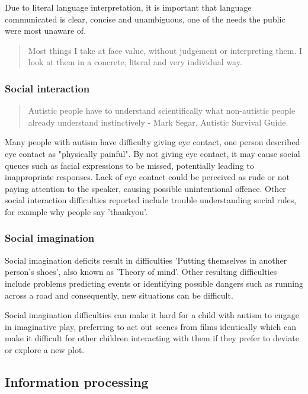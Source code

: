 \documentclass[11pt]{report}
\begin{document}
Due to literal language interpretation, it is important that language communicated is clear, concise and unambiguous, one of the needs the public were most unaware of\cite{autismmisconception}.

\begin{quote}
Most things I take at face value, without judgement or interpreting them. I look at them in a concrete, literal and very individual way. \cite{olgab}
\end{quote}

\subsubsection*{Social interaction}

\begin{quote}
Autistic people have to understand scientifically what non-autistic people already understand instinctively 
- Mark Segar, Autistic Survival Guide.
\end{quote}

Many people with autism have difficulty giving eye contact, one person described eye contact as "physically painful". By not giving eye contact, it may cause social queues such as facial expressions to be missed, potentially leading to inappropriate responses. Lack of eye contact could be perceived as rude or not paying attention to the speaker, causing possible unintentional offence. Other social interaction difficulties reported include trouble understanding social rules\cite{nas}, for example why people say 'thankyou'.

\subsubsection*{Social imagination}
Social imagination deficits result in difficulties 'Putting themselves in another person's shoes', also known as 'Theory of mind'. Other resulting difficulties include problems predicting events or identifying possible dangers such as running across a road and consequently, new situations can be difficult.\cite{nas}

Social imagination difficulties can make it hard for a child with autism to engage in imaginative play, preferring to act out scenes from films identically which can make it difficult for other children interacting with them if they prefer to deviate or explore a new plot.\cite{nas}

\subsection{Information processing}
\end{document}
